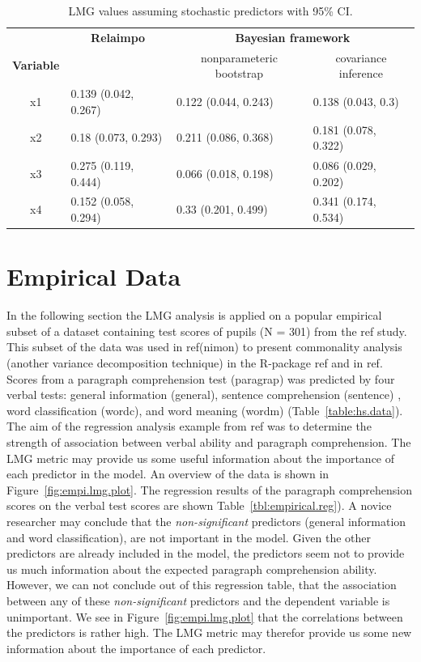 \documentclass[11pt,a4paper,twoside]{book}
\begin{document}
\begin{table}[h]
\caption{LMG values assuming stochastic predictors with 95\% CI.}
\centering
\begin{tabular}{clll}
   \toprule
  & \multicolumn{1}{c}{\textbf{Relaimpo}} & \multicolumn{2}{c}{\textbf{Bayesian framework}} \\ \cmidrule(r){2-2}\cmidrule(l){3-4}
 \textbf{Variable} &  & \multicolumn{1}{c}{nonparameteric bootstrap}& \multicolumn{1}{c}{covariance inference} \\
 \midrule
x1 & 0.139 (0.042, 0.267)  & 0.122 (0.044, 0.243) &  0.138 (0.043, 0.3) \\ 
x2 & 0.18 (0.073, 0.293)  & 0.211 (0.086, 0.368)  & 0.181 (0.078, 0.322) \\ 
x3 & 0.275 (0.119, 0.444)  & 0.066 (0.018, 0.198)  & 0.086 (0.029, 0.202) \\ 
x4 & 0.152 (0.058, 0.294) & 0.33 (0.201, 0.499) & 0.341 (0.174, 0.534) \\ 
   \bottomrule
\end{tabular}
\label{tbl:nonstochEx1relaimpstoch}
\end{table}







\clearpage

\section{Empirical Data}
In the following section the LMG analysis is applied on a popular empirical subset of a dataset containing test scores of pupils (N = 301) from the ref study. This subset of the data was used in ref(nimon) to present commonality analysis (another variance decomposition technique) in the R-package ref and in ref. Scores from a paragraph comprehension test (paragrap) was predicted by four verbal tests:  general information (general),  sentence comprehension (sentence) ,  word classification (wordc), and  word meaning (wordm) (Table~\ref{table:hs.data}). The aim of the regression analysis example from ref was to determine the strength of association between verbal ability and paragraph comprehension. The LMG metric may provide us some useful information about the importance of each predictor in the model. 
An overview of the data is shown in Figure~\ref{fig:empi.lmg.plot}. The regression results of the paragraph comprehension scores on the verbal test scores are shown Table~\ref{tbl:empirical.reg}). A novice researcher may conclude that the \textit{non-significant} predictors (general information and word classification), are not important in the model. Given the other predictors are already included in the model, the predictors seem not to provide us much information about the expected paragraph comprehension ability. However, we can not conclude out of this regression table, that the association between any of these \textit{non-significant} predictors and the dependent variable is unimportant. We see in Figure~\ref{fig:empi.lmg.plot} that the correlations between the predictors is rather high. The LMG metric may therefor provide us some new information about the importance of each predictor. 
\end{document}
